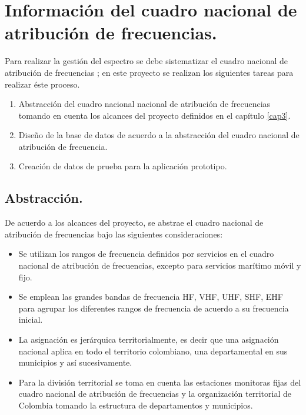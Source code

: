 \section{Información del cuadro nacional de atribución de frecuencias.}

Para realizar la gestión del espectro se debe sistematizar el cuadro nacional de atribución de frecuencias \cite{Cuadro}; en este proyecto se realizan los siguientes tareas para realizar éste proceso.

\begin{enumerate}
	\item Abstracción del cuadro nacional nacional de atribución de frecuencias tomando en cuenta los alcances del proyecto definidos en el capítulo \ref{cap3}.
	\item Diseño de la base de datos de acuerdo a la abstracción del cuadro nacional de atribución de frecuencia.
	\item Creación de datos de prueba para la aplicación prototipo.
\end{enumerate}

\subsection{Abstracción.}

De acuerdo a los alcances del proyecto, se abstrae el cuadro nacional de atribución de frecuencias \cite{Cuadro} bajo las siguientes consideraciones:

\begin{itemize}
	\item Se utilizan los rangos de frecuencia definidos por servicios en el cuadro nacional de atribución de frecuencias, excepto para servicios marítimo móvil y fijo.
	\item Se emplean las grandes bandas de frecuencia HF, VHF, UHF, SHF, EHF para agrupar los diferentes rangos de frecuencia de acuerdo a su frecuencia inicial.
	\item La asignación es jerárquica territorialmente, es decir que una asignación nacional aplica en todo el territorio colombiano, una departamental en sus municipios y así sucesivamente.
	\item Para la división territorial se toma en cuenta las estaciones monitoras fijas del cuadro nacional de atribución de frecuencias y la organización territorial de Colombia \cite{OrgDANE} tomando la estructura de departamentos y municipios.
\end{itemize}

